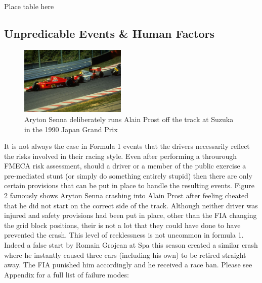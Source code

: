 \documentclass[12pt]{article} %
\begin{document}
Place table here

\subsection{Unpredicable Events \& Human Factors} %


\begin{figure} %
  \begin{center}
    \includegraphics[width=0.45\textwidth]{senna-prost}
  \end{center}
\parbox{7cm}{\caption{Aryton Senna deliberately runs Alain Prost off the track at Suzuka in the 1990 Japan Grand Prix}}
\end{figure}

It is not always the case in Formula 1 events that the drivers necessarily reflect the risks involved in their racing style. Even after performing a throurough FMECA risk assessment, should a driver or a member of the public exercise a pre-mediated stunt (or simply do something entirely stupid) then there are only certain provisions that can be put in place to handle the resulting events. Figure 2 famously shows Aryton Senna crashing into Alain Prost after feeling cheated that he did not start on the correct side of the track. Although neither driver was injured and safety provisions had been put in place, other than the FIA changing the grid block positions, their is not a lot that they could have done to have prevented the crash. This level of recklessness is not uncommon in formula 1. Indeed a false start by Romain Grojean at Spa this season created a similar crash where he instantly caused three cars (including his own) to be retired straight away. The FIA punished him accordingly and he received a race ban. Please see Appendix %
for a full list of failure modes:
\end{document}
